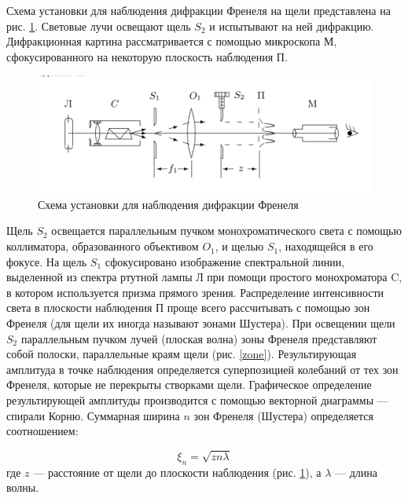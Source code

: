 \documentclass[a4paper,12pt]{article} %
\begin{document}
Схема установки для наблюдения дифракции Френеля на щели представлена на рис. \ref{labA}. Световые лучи освещают щель $ S_2 $ и испытывают на ней дифракцию. Дифракционная картина рассматривается с помощью микроскопа М, сфокусированного на некоторую плоскость наблюдения П.

\begin{figure}[H]
	\centering
	\includegraphics[scale=0.15]{alab.jpeg}
	\caption{Схема установки для наблюдения дифракции Френеля}
	\label{labA}
\end{figure}

Щель $ S_2 $ освещается параллельным пучком монохроматического света с помощью коллиматора, образованного объективом $ O_1 $, и щелью $S_1$, находящейся в его фокусе. На щель $ S_1 $ сфокусировано изображение спектральной линии, выделенной из спектра ртутной лампы Л при помощи простого монохроматора C, в котором используется призма прямого зрения. Распределение интенсивности света в плоскости наблюдения П проще всего рассчитывать с помощью зон Френеля (для щели их иногда называют зонами Шустера). При освещении щели $ S_2 $ параллельным пучком лучей (плоская волна) зоны Френеля представляют собой полоски, параллельные краям щели (рис. \ref{zone}). Результирующая амплитуда в точке наблюдения определяется суперпозицией колебаний от тех зон Френеля, которые не перекрыты створками щели. Графическое определение результирующей амплитуды производится с помощью векторной диаграммы --- спирали Корню. Суммарная ширина $ n $ зон Френеля (Шустера) определяется соотношением:

\begin{equation}\label{xin}
\xi_n = \sqrt{zn\lambda}
\end{equation}
где $ z $ --- расстояние от щели до плоскости наблюдения (рис. \ref{labA}), а $ \lambda $ --- длина волны.
\end{document}
